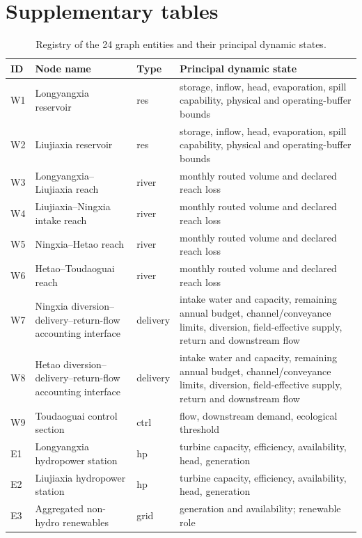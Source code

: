 \documentclass [a4paper,fleqn] {cas-dc}
\begin{document}
\begin{table}[pos=t]
{\normalfont\normalsize
\section{Supplementary tables}
\label{app:supplementary-tables}}
\caption{Registry of the 24 graph entities and their principal dynamic states.}
\label{tab:definitions}
\centering
\footnotesize
\renewcommand{\arraystretch}{1.04}
\begin{tabularx}{\textwidth}{@{}l >{\raggedright\arraybackslash}p{} l
  >{\raggedright\arraybackslash}X@{}}
\toprule
ID & Node name & Type & Principal dynamic state \\
\midrule
W1 & Longyangxia reservoir & res & storage, inflow, head, evaporation, spill capability, physical and operating-buffer bounds \\
W2 & Liujiaxia reservoir & res & storage, inflow, head, evaporation, spill capability, physical and operating-buffer bounds \\
W3 & Longyangxia--Liujiaxia reach & river & monthly routed volume and declared reach loss \\
W4 & Liujiaxia--Ningxia intake reach & river & monthly routed volume and declared reach loss \\
W5 & Ningxia--Hetao reach & river & monthly routed volume and declared reach loss \\
W6 & Hetao--Toudaoguai reach & river & monthly routed volume and declared reach loss \\
W7 & Ningxia diversion--delivery--return-flow accounting interface & delivery & intake water and capacity, remaining annual budget, channel/conveyance limits, diversion, field-effective supply, return and downstream flow \\
W8 & Hetao diversion--delivery--return-flow accounting interface & delivery & intake water and capacity, remaining annual budget, channel/conveyance limits, diversion, field-effective supply, return and downstream flow \\
W9 & Toudaoguai control section & ctrl & flow, downstream demand, ecological threshold \\
\midrule
E1 & Longyangxia hydropower station & hp & turbine capacity, efficiency, availability, head, generation \\
E2 & Liujiaxia hydropower station & hp & turbine capacity, efficiency, availability, head, generation \\
E3 & Aggregated non-hydro renewables & grid & generation and availability; renewable role \\

\end{tabularx}
\end{table}
\end{document}
